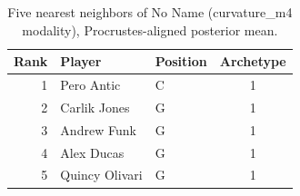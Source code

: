 \begin{table}[htbp]
  \centering\small
  \begin{tabular}{rllc}
    \toprule
    Rank & Player & Position & Archetype \\
    \midrule
    1 & Pero Antic & C & 1 \\
    2 & Carlik Jones & G & 1 \\
    3 & Andrew Funk & G & 1 \\
    4 & Alex Ducas & G & 1 \\
    5 & Quincy Olivari & G & 1 \\
    \bottomrule
  \end{tabular}
  \caption{Five nearest neighbors of No Name (curvature_m4 modality), Procrustes-aligned posterior mean.}
  \label{tab:No_Name_neighbors_curvature_m4}
\end{table}

